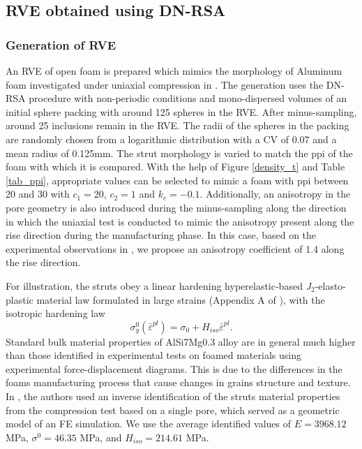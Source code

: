 \subsection{RVE obtained using DN-RSA}\label{res-fem-rsa}
\subsubsection*{Generation of RVE}
An RVE of open foam is prepared which mimics the morphology of Aluminum foam investigated under uniaxial compression in \cite{jungMicrostructuralCharacterisationExperimental2017}. The generation uses the DN-RSA procedure with non-periodic conditions and mono-dispersed volumes of an initial sphere packing with around 125 spheres in the RVE. After minus-sampling, around 25 inclusions remain in the RVE. The radii of the spheres in the packing are randomly chosen from a logarithmic distribution with a CV of 0.07 and a mean radius of 0.125mm. The strut morphology is varied to match the ppi of the foam with which it is compared. With the help of Figure \ref{density_t} and Table \ref{tab_ppi}, appropriate values can be selected to mimic a foam with ppi between 20 and 30 with $ c_1=20 $, $ c_2=1 $ and $ k_c=-0.1 $. Additionally, an anisotropy in the pore geometry is also introduced during the minus-sampling along the direction in which the uniaxial test is  conducted to mimic the anisotropy present along the rise direction during the manufacturing phase. In this case, based on the experimental observations in \cite{jungMicrostructuralCharacterisationExperimental2017}, we propose an anisotropy coefficient of 1.4 along the rise direction. 

For illustration, the struts obey a linear hardening hy\-per\-elas\-tic-based \textit{J}$_2 $-elasto-plastic material law formulated in large strains (Appendix A of \cite{nguyenComputationalHomogenizationCellular2014}), with the isotropic hardening law
\[ \sigma_y^0(\bar{\varepsilon}^{pl}) =\sigma_0+H_{iso}\bar{\varepsilon}^{pl}.
\]
Standard bulk material properties of AlSi7Mg0.3 alloy are in general much higher than those identified in experimental tests on foamed materials \cite{heinzeExperimentalNumericalInvestigation2018} using experimental force-displacement diagrams. This is due to the differences in the foams manufacturing process that cause changes in grains structure and texture. In \cite{heinzeExperimentalNumericalInvestigation2018}, the authors used an inverse identification of the struts material properties from the compression test based on a single pore, which served as a geometric model of an FE simulation. We use the average identified values of $ E=3968.12 $ MPa, $ \sigma^0=46.35 $ MPa, and $ H_{iso}=214.61 $ MPa.


